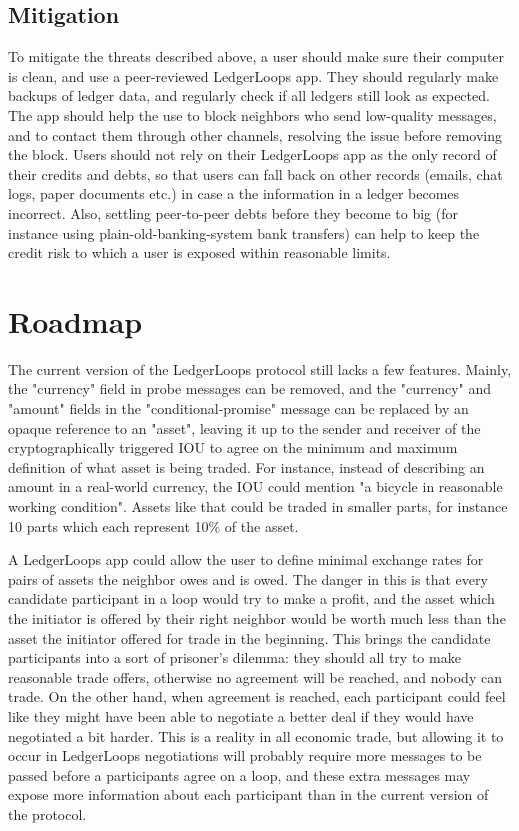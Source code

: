 \documentclass[11pt,twoside,a4paper]{article}
\begin{document}
\subsection{Mitigation}
To mitigate the threats described above, a user should make sure their computer is clean, and use a peer-reviewed LedgerLoops app.
They should regularly make backups of ledger data, and regularly check if all ledgers still look as expected.
The app should help the use to block neighbors who send low-quality messages, and to contact them through other channels, resolving the issue before removing the block.
Users should not rely on their LedgerLoops app as the only record of their credits and debts, so that users can fall back on other records (emails, chat logs, paper documents etc.) in case a the information in a ledger becomes incorrect. Also, settling peer-to-peer debts before they become to big (for instance using plain-old-banking-system bank transfers) can help to keep the credit risk to which a user is exposed within reasonable limits.

\section{Roadmap}
The current version of the LedgerLoops protocol still lacks a few features. Mainly, the "currency" field in probe messages can be removed, and the "currency" and "amount" fields in the "conditional-promise" message can be replaced by an opaque reference to an "asset", leaving it up to the sender and receiver of the cryptographically triggered IOU to agree on the minimum and maximum definition of what asset is being traded. For instance, instead of describing an amount in a real-world currency, the IOU could mention "a bicycle in reasonable working condition". Assets like that could be traded in smaller parts, for instance 10 parts which each represent 10\% of the asset.

A LedgerLoops app could allow the user to define minimal exchange rates for pairs of assets the neighbor owes and is owed. The danger in this is that every candidate participant in a loop would try to make a profit, and the asset which the initiator is offered by their right neighbor would be worth much less than the asset the initiator offered for trade in the beginning. This brings the candidate participants into a sort of prisoner's dilemma: they should all try to make reasonable trade offers, otherwise no agreement will be reached, and nobody can trade. On the other hand, when agreement is reached, each participant could feel like they might have been able to negotiate a better deal if they would have negotiated a bit harder. This is a reality in all economic trade, but allowing it to occur in LedgerLoops negotiations will probably require more messages to be passed before a participants agree on a loop, and these extra messages may expose more information about each participant than in the current version of the protocol.
\end{document}
